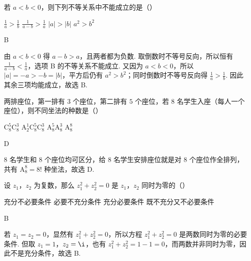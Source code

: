 \begin{problem}
若 \(a<b<0\)，则下列不等关系中不能成立的是（\quad）

\choices
    {\(\frac{1}{a}>\frac{1}{b}\)}
    {\(\frac{1}{a-b}>\frac{1}{a}\)}
    {\(|a|>|b|\)}
    {\(a^2>b^2\)}
\end{problem}

\begin{answer}
B
\end{answer}

\begin{solution}
由 \(a<b<0\) 得 \(a-b>a\)，且两者都为负数. 取倒数时不等号反向，所以恒有 \(\frac{1}{a-b}<\frac{1}{a}\)，选项 B 的不等关系不能成立. 又因为 \(a<b<0\)，所以 \(|a|=-a>-b=|b|\)，平方后仍有 \(a^2>b^2\)；同时倒数时不等号反向得 \(\frac{1}{a}>\frac{1}{b}\). 因此其余三项均能成立，故选 B.
\end{solution}

\begin{problem}
两排座位，第一排有 \(3\) 个座位，第二排有 \(5\) 个座位，若 \(8\) 名学生入座（每人一个座位），则不同坐法的种数是（\quad）

\choices
    {\(\mathrm C_8^5 \mathrm C_8^3\)}
    {\(\mathrm A_2^1 \mathrm C_8^5 \mathrm C_8^3\)}
    {\(\mathrm A_8^5 \mathrm A_8^3\)}
    {\(\mathrm A_8^8\)}
\end{problem}

\begin{answer}
D
\end{answer}

\begin{solution}
8 名学生和 8 个座位均可区分，给 8 名学生安排座位就是对 8 个座位作全排列，共有 \(\mathrm A_8^8=8!\) 种坐法，故选 D.
\end{solution}

\begin{problem}
设 \(z_1\)，\(z_2\) 为复数，那么 \(z_1^2+z_2^2=0\) 是 \(z_1\)，\(z_2\) 同时为零的（\quad）

\choices
    {充分不必要条件}
    {必要不充分条件}
    {充分必要条件}
    {既不充分又不必要条件}
\end{problem}

\begin{answer}
B
\end{answer}

\begin{solution}
若 \(z_1=z_2=0\)，显然有 \(z_1^2+z_2^2=0\)，所以方程 \(z_1^2+z_2^2=0\) 是两数同时为零的必要条件. 但取 \(z_1=1\)，\(z_2=\i\)，也有 \(z_1^2+z_2^2=1-1=0\)，而两数并非同时为零，因此不是充分条件，故选 B.
\end{solution}


